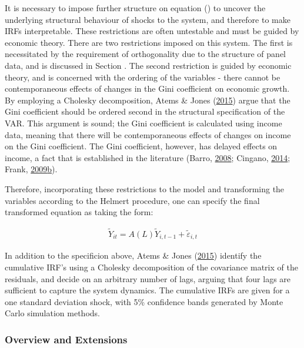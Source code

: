 \documentclass[11pt,preprint, authoryear]{elsarticle}
\numberwithin{equation}{section}
\numberwithin{figure}{section}
\numberwithin{table}{section}
\begin{document}
It is necessary to impose further structure on equation () to
uncover the underlying structural behaviour of shocks to the system, and
therefore to make IRFs interpretable. These restrictions are often
untestable and must be guided by economic theory. There are two
restrictions imposed on this system. The first is necessitated by the
requirement of orthogonality due to the structure of panel data, and is
discussed in Section . The second restriction is guided
by economic theory, and is concerned with the ordering of the variables
- there cannot be contemporaneous effects of changes in the Gini
coefficient on economic growth. By employing a Cholesky decomposition,
Atems \& Jones (\protect\hyperlink{ref-atems}{2015}) argue that the Gini
coefficient should be ordered second in the structural specification of
the VAR. This argument is sound; the Gini coefficient is calculated
using income data, meaning that there will be contemporaneous effects of
changes on income on the Gini coefficient. The Gini coefficient,
however, has delayed effects on income, a fact that is established in
the literature (Barro, \protect\hyperlink{ref-barro}{2008}; Cingano,
\protect\hyperlink{ref-cingano}{2014}; Frank,
\protect\hyperlink{ref-frankincome}{2009}\protect\hyperlink{ref-frankincome}{b}).

Therefore, incorporating these restrictions to the model and
transforming the variables according to the Helmert procedure, one can
specify the final transformed equation as taking the form:

\begin{align}\tag{2}
\tilde{Y}_{it} = A(L) \tilde{Y}_{i, t-1} + \tilde{\varepsilon}_{i,t} \label{eq2}
\end{align}

In addition to the specificion above, Atems \& Jones
(\protect\hyperlink{ref-atems}{2015}) identify the cumulative IRF's
using a Cholesky decomposition of the covariance matrix of the
residuals, and decide on an arbitrary number of lags, arguing that four
lags are sufficient to capture the system dynamics. The cumulative IRFs
are given for a one standard deviation shock, with 5\% confidence bands
generated by Monte Carlo simulation methods.

\hypertarget{overview-and-extensions}{%
\subsubsection*{Overview and Extensions}\label{overview-and-extensions}}
\end{document}
